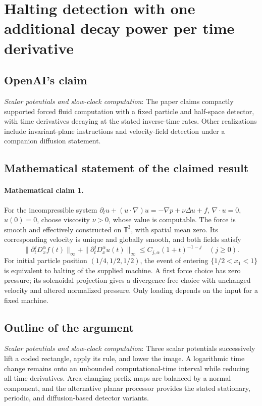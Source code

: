 \documentclass[11pt]{article}
\begin{document}
\section*{Halting detection with one additional decay power per time derivative}

\subsection{OpenAI's claim}
\textit{Scalar potentials and slow-clock computation}: The paper claims compactly supported forced fluid computation with a fixed particle and half-space detector, with time derivatives decaying at the stated inverse-time rates. Other realizations include invariant-plane instructions and velocity-field detection under a companion diffusion statement.

\subsection{Mathematical statement of the claimed result}
\paragraph{Mathematical claim 1.} For the incompressible system $\partial_tu+(u\cdot\nabla)u=-\nabla p+\nu\Delta u+f$, $\nabla\cdot u=0$, $u(0)=0$, choose viscosity $\nu>0$, whose value is computable. The force is smooth and effectively constructed on $\mathbb T^3$, with spatial mean zero. Its corresponding velocity is unique and globally smooth, and both fields satisfy \[\|\partial_t^jD_x^\alpha f(t)\|_\infty+\|\partial_t^jD_x^\alpha u(t)\|_\infty\le C_{j,\alpha}(1+t)^{-1-j}\quad(j\ge0).\] For initial particle position $(1/4,1/2,1/2)$, the event of entering $\{1/2<x_1<1\}$ is equivalent to halting of the supplied machine. A first force choice has zero pressure; its solenoidal projection gives a divergence-free choice with unchanged velocity and altered normalized pressure. Only loading depends on the input for a fixed machine.

\subsection{Outline of the argument}
\textit{Scalar potentials and slow-clock computation}: Three scalar potentials successively lift a coded rectangle, apply its rule, and lower the image. A logarithmic time change remains onto an unbounded computational-time interval while reducing all time derivatives. Area-changing prefix maps are balanced by a normal component, and the alternative planar processor provides the stated stationary, periodic, and diffusion-based detector variants.
\end{document}
